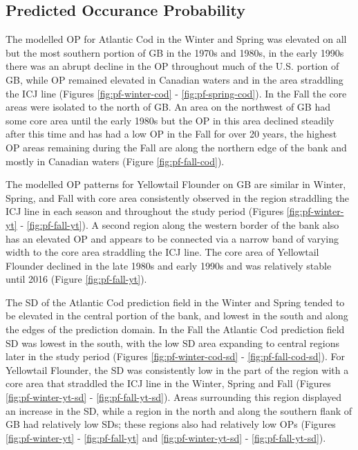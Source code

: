 \documentclass[
]{article}
\begin{document}
\begin{landscape}
\clearpage

\hypertarget{predicted-occurance-probability}{%
\section{Predicted Occurance Probability}\label{predicted-occurance-probability}}

The modelled OP for Atlantic Cod in the Winter and Spring was elevated on all but the most southern portion of GB in the 1970s and 1980s, in the early 1990s there was an abrupt decline in the OP throughout much of the U.S. portion of GB, while OP remained elevated in Canadian waters and in the area straddling the ICJ line (Figures \ref{fig:pf-winter-cod} - \ref{fig:pf-spring-cod}). In the Fall the core areas were isolated to the north of GB. An area on the northwest of GB had some core area until the early 1980s but the OP in this area declined steadily after this time and has had a low OP in the Fall for over 20 years, the highest OP areas remaining during the Fall are along the northern edge of the bank and mostly in Canadian waters (Figure \ref{fig:pf-fall-cod}).

The modelled OP patterns for Yellowtail Flounder on GB are similar in Winter, Spring, and Fall with core area consistently observed in the region straddling the ICJ line in each season and throughout the study period (Figures \ref{fig:pf-winter-yt} - \ref{fig:pf-fall-yt}). A second region along the western border of the bank also has an elevated OP and appears to be connected via a narrow band of varying width to the core area straddling the ICJ line. The core area of Yellowtail Flounder declined in the late 1980s and early 1990s and was relatively stable until 2016 (Figure \ref{fig:pf-fall-yt}).

The SD of the Atlantic Cod prediction field in the Winter and Spring tended to be elevated in the central portion of the bank, and lowest in the south and along the edges of the prediction domain. In the Fall the Atlantic Cod prediction field SD was lowest in the south, with the low SD area expanding to central regions later in the study period (Figures \ref{fig:pf-winter-cod-sd} - \ref{fig:pf-fall-cod-sd}). For Yellowtail Flounder, the SD was consistently low in the part of the region with a core area that straddled the ICJ line in the Winter, Spring and Fall (Figures \ref{fig:pf-winter-yt-sd} - \ref{fig:pf-fall-yt-sd}). Areas surrounding this region displayed an increase in the SD, while a region in the north and along the southern flank of GB had relatively low SDs; these regions also had relatively low OPs (Figures \ref{fig:pf-winter-yt} - \ref{fig:pf-fall-yt} and \ref{fig:pf-winter-yt-sd} - \ref{fig:pf-fall-yt-sd}).


\end{landscape}
\end{document}
